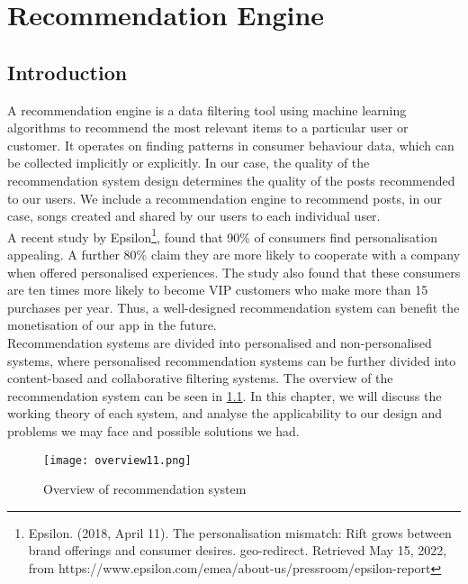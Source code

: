 

\chapter{Recommendation Engine}%
\label{Chapter6} %

\section{Introduction}
A recommendation engine is a data filtering tool using machine learning algorithms to recommend the most relevant items to a particular user or customer. It operates on finding patterns in consumer behaviour data, which can be collected implicitly or explicitly. In our case, the quality of the recommendation system design determines the quality of the posts recommended to our users. We include a recommendation engine to recommend posts, in our case, songs created and shared by our users to each individual user.
\\A recent study by Epsilon\footnote{Epsilon. (2018, April 11). The personalisation mismatch: Rift grows between brand offerings and consumer desires. geo-redirect. Retrieved May 15, 2022, from https://www.epsilon.com/emea/about-us/pressroom/epsilon-report }, found that 90\% of consumers find personalisation appealing. A further 80\% claim they are more likely to cooperate with a company when offered personalised experiences.
The study also found that these consumers are ten times more likely to become VIP customers who make more than 15 purchases per year.
Thus, a well-designed recommendation system can benefit the monetisation of our app in the future.
\\Recommendation systems are divided into personalised and non-personalised systems, where personalised recommendation systems can be further divided into content-based and collaborative filtering systems. 
The overview of the recommendation system can be seen in \cref{fig:overrecomm}. In this chapter, we will discuss the working theory of each system, and analyse the applicability to our design and problems we may face and possible solutions we had.
\begin{figure}[ht]
\centering
\texttt{[image: overview11.png]}
\caption{Overview of recommendation system}
\label{fig:overrecomm}
\end{figure}

